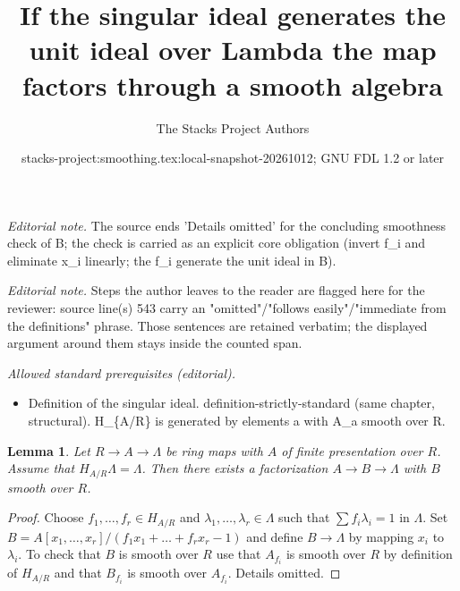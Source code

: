 \documentclass{stacks-project}
\title{If the singular ideal generates the unit ideal over Lambda the map factors through a smooth algebra}
\author{The Stacks Project Authors}
\date{stacks-project:smoothing.tex:local-snapshot-20261012; GNU FDL 1.2 or later}
\theoremstyle{plain}
\newtheorem{lemma}[subsection]{Lemma}
\theoremstyle{definition}
\theoremstyle{remark}
\numberwithin{equation}{subsection}
\begin{document}
\maketitle
\noindent\textit{Editorial note.} The source ends 'Details omitted' for the concluding smoothness check of B; the check is carried as an explicit core obligation (invert f\_i and eliminate x\_i linearly; the f\_i generate the unit ideal in B).\par\medskip
\noindent\textit{Editorial note.} Steps the author leaves to the reader are flagged here for the reviewer: source line(s) 543 carry an "omitted"/"follows easily"/"immediate from the definitions" phrase. Those sentences are retained verbatim; the displayed argument around them stays inside the counted span.\par\medskip
\noindent\textit{Allowed standard prerequisites (editorial).}\begin{itemize}
\item Definition of the singular ideal. definition-strictly-standard (same chapter, structural). H\_\{A/R\} is generated by elements a with A\_a smooth over R.
\end{itemize}\medskip
\begin{lemma}
\label{lemma-final-solve}
Let $R \to A \to \Lambda$ be ring maps with $A$ of finite presentation
over $R$. Assume that $H_{A/R} \Lambda = \Lambda$. Then there exists
a factorization $A \to B \to \Lambda$ with $B$ smooth over $R$.
\end{lemma}

\begin{proof}
Choose $f_1, \ldots, f_r \in H_{A/R}$ and
$\lambda_1, \ldots, \lambda_r \in \Lambda$ such that
$\sum f_i\lambda_i = 1$ in $\Lambda$. Set
$B = A[x_1, \ldots, x_r]/(f_1x_1 + \ldots + f_rx_r - 1)$
and define $B \to \Lambda$ by mapping $x_i$ to $\lambda_i$.
To check that $B$ is smooth over $R$ use that $A_{f_i}$ is smooth
over $R$ by definition of $H_{A/R}$ and that $B_{f_i}$ is smooth
over $A_{f_i}$. Details omitted.
\end{proof}
\end{document}

